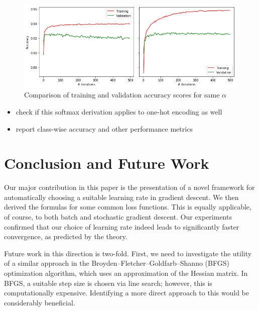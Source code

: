 \documentclass{article}
\begin{document}
\begin{figure}
    \centering
    \includegraphics[scale=0.5]{mnist_train_val.png}
    \caption{Comparison of training and validation accuracy scores for same $\alpha$}
    \label{fig:classif:2}
\end{figure}

\begin{itemize}
    \item check if this softmax derivation applies to one-hot encoding as well
    \item report class-wise accuracy and other performance metrics
\end{itemize}

\section{Conclusion and Future Work}
Our major contribution in this paper is the presentation of a novel framework for automatically choosing a suitable learning rate in gradient descent. We then derived the formulas for some common loss functions. This is equally applicable, of course, to both batch and stochastic gradient descent. Our experiments confirmed that our choice of learning rate indeed leads to significantly faster convergence, as predicted by the theory.

Future work in this direction is two-fold. First, we need to investigate the utility of a similar approach in the Broyden–Fletcher–Goldfarb–Shanno (BFGS)\cite{broyden1970convergence}\cite{fletcher1970new}\cite{goldfarb1970family}\cite{shanno1970conditioning} optimization algorithm, which uses an approximation of the Hessian matrix. In BFGS, a suitable step size is chosen via line search; however, this is computationally expensive. Identifying a more direct approach to this would be considerably beneficial.
\end{document}
